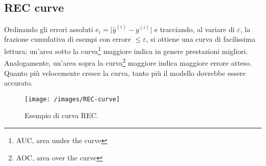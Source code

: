 \subsection{REC curve}
Ordinando gli errori assoluti \(e_i=\lvert \hat y^{(i)}-y^{(i)}\rvert\) e
tracciando, al variare di \(\varepsilon\), la frazione cumulativa di esempi con errore
\(\le\varepsilon\), si ottiene una curva di facilissima lettura; un’area sotto la curva\footnote{AUC, area under the curve} maggiore indica in genere prestazioni migliori. Analogamente, un'area sopra la curva\footnote{AOC, area over the curve} maggiore indica maggiore errore atteso. Quanto più velocemente cresce la curva, tanto più il modello dovrebbe essere accurato.

\begin{figure}[tbph]
	\centering
	\texttt{[image: /images/REC-curve]}
	\caption{Esempio di curva REC.}
	\label{fig:rec-curve}
\end{figure}
